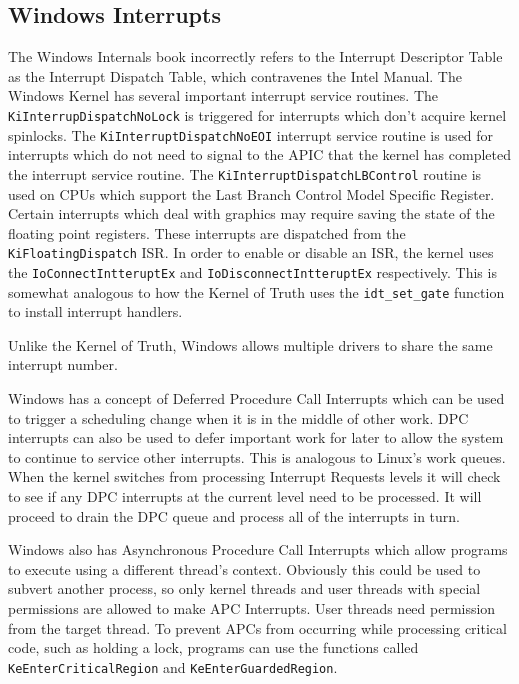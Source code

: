 \documentclass[10pt,conference,draftclsnofoot,onecolumn]{IEEEtran}
\begin{document}
\subsection{Windows Interrupts}
The Windows Internals book incorrectly refers to the Interrupt Descriptor Table as the Interrupt Dispatch Table, which contravenes the Intel Manual. The Windows Kernel has several important interrupt service routines. The \texttt{KiInterrupDispatchNoLock} is triggered for interrupts which don't acquire kernel spinlocks. The \texttt{KiInterruptDispatchNoEOI} interrupt service routine is used for interrupts which do not need to signal to the APIC that the kernel has completed the interrupt service routine. The \texttt{KiInterruptDispatchLBControl} routine is used on CPUs which support the Last Branch Control Model Specific Register. Certain interrupts which deal with graphics may require saving the state of the floating point registers. These interrupts are dispatched from the \texttt{KiFloatingDispatch} ISR. In order to enable or disable an ISR, the kernel uses the \texttt{IoConnectIntteruptEx} and \texttt{IoDisconnectIntteruptEx} respectively. This is somewhat analogous to how the Kernel of Truth uses the \texttt{idt\_set\_gate} function to install interrupt handlers.

Unlike the Kernel of Truth, Windows allows multiple drivers to share the same interrupt number.

Windows has a concept of Deferred Procedure Call Interrupts which can be used to trigger a scheduling change when it is in the middle of other work. DPC interrupts can also be used to defer important work for later to allow the system to continue to service other interrupts. This is analogous to Linux's work queues. When the kernel switches from processing Interrupt Requests levels it will check to see if any DPC interrupts at the current level need to be processed. It will proceed to drain the DPC queue and process all of the interrupts in turn.

Windows also has Asynchronous Procedure Call Interrupts which allow programs to execute using a different thread's context. Obviously this could be used to subvert another process, so only kernel threads and user threads with special permissions are allowed to make APC Interrupts. User threads need permission from the target thread. To prevent APCs from occurring while processing critical code, such as holding a lock, programs can use the functions called \texttt{KeEnterCriticalRegion} and \texttt{KeEnterGuardedRegion}\cite{2_russinovich_solomon_ionescu_2012}.
\end{document}
